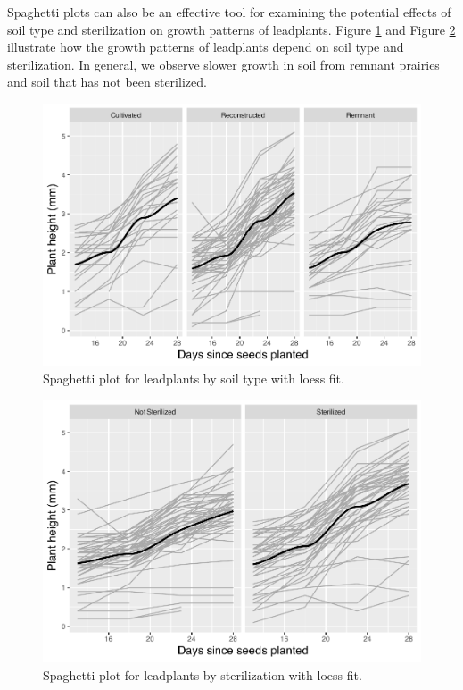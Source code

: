 \documentclass[
]{krantz}
\begin{document}
Spaghetti plots can also be an effective tool for examining the potential effects of soil type and sterilization on growth patterns of leadplants. Figure \ref{fig:spaglpsoil} and Figure \ref{fig:spaglpster} illustrate how the growth patterns of leadplants depend on soil type and sterilization. In general, we observe slower growth in soil from remnant prairies and soil that has not been sterilized.

\begin{figure}

{\centering \includegraphics[width=0.6\linewidth]{bookdown-BeyondMLR_files/figure-latex/spaglpsoil-1} 

}

\caption{Spaghetti plot for leadplants by soil type with loess fit.}\label{fig:spaglpsoil}
\end{figure}

\begin{figure}

{\centering \includegraphics[width=0.6\linewidth]{bookdown-BeyondMLR_files/figure-latex/spaglpster-1} 

}

\caption{Spaghetti plot for leadplants by sterilization with loess fit.}\label{fig:spaglpster}
\end{figure}
\end{document}
